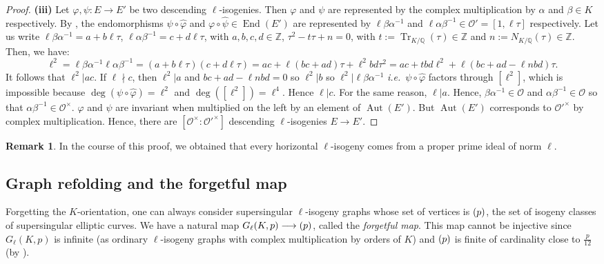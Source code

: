 \documentclass[a4paper,10pt]{report}
\theoremstyle{definition}
\theoremstyle{plain}
\theoremstyle{definition}
\newtheorem{Remark}[Definition]{Remark}
\newcommand{\ie}{\emph{i.e.}\ }
\newcommand{\Z}{\mathbb{Z}}
\newcommand{\Q}{\mathbb{Q}}
\newcommand{\mO}{\mathcal{O}}
\renewcommand{\(}{\left(}
\renewcommand{\)}{\right)}
\DeclareMathOperator{\End}{End}
\DeclareMathOperator{\Aut}{Aut}
\DeclareMathOperator{\Tr}{Tr}
\let\SS\relax
\DeclareMathOperator{\SS}{SS}
\begin{document}
\begin{proof}
\textbf{(iii)} Let $\varphi, \psi : E\longrightarrow E'$ be two descending $\ell$-isogenies. Then $\varphi$ and $\psi$ are represented by the complex multiplication by $\alpha$ and $\beta\in K$ respectively.  By \cite[exercise 6.10.(b)]{Silverman1},  the endomorphisms $\psi\circ\widehat{\varphi}$ and $\varphi\circ\widehat{\psi}\in\End(E')$ are represented by $\ell\beta\alpha^{-1}$ and $\ell\alpha\beta^{-1}\in\mO'=[1,\ell\tau]$ respectively.  Let us write $\ell\beta\alpha^{-1}=a+b\ell\tau$, $\ell\alpha\beta^{-1}=c+d\ell\tau$, with $a,b,c,d\in\Z$, $\tau^2-t\tau+n=0$, with $t:=\Tr_{K/\Q}(\tau)\in \Z$ and $n:=N_{K/\Q}(\tau)\in \Z$.  Then, we have:
\[\ell^2=\ell\beta\alpha^{-1}\ell\alpha\beta^{-1}=(a+b\ell\tau)(c+d\ell\tau)=ac+\ell(bc+ad)\tau+\ell^2bd\tau^2=ac+tbd\ell^2+\ell(bc+ad-\ell n bd)\tau.\]
It follows that $\ell^2|ac$.  If $\ell\nmid c$, then $\ell^2|a$ and $bc+ad-\ell n bd=0$ so $\ell^2|b$ so $\ell^2|\ell\beta\alpha^{-1}$ \ie  $\psi\circ\widehat{\varphi}$ factors through $[\ell^2]$, which is impossible because $\deg(\psi\circ\widehat{\varphi})=\ell^2$ and $\deg([\ell^2])=\ell^4$. Hence $\ell|c$. For the same reason, $\ell|a$. Hence, $\beta\alpha^{-1}\in\mO$ and $\alpha\beta^{-1}\in\mO$ so that $\alpha\beta^{-1}\in\mO^\times$.  $\varphi$ and $\psi$ are invariant when multiplied on the left by an element of $\Aut(E')$. But $\Aut(E')$ corresponds to $\mO'^\times$ by complex multiplication. Hence, there are $[\mO^\times:\mO'^\times]$ descending $\ell$-isogenies $E\longrightarrow E'$.
\end{proof}

\begin{Remark}\label{Remark 2}
In the course of this proof, we obtained that every horizontal $\ell$-isogeny comes from a proper prime ideal of norm $\ell$.
\end{Remark}

\subsection{Graph refolding and the forgetful map}

Forgetting the $K$-orientation, one can always consider supersingular $\ell$-isogeny graphs whose set of vertices is $\SS(p)$, the set of isogeny classes of supersingular elliptic curves. We have a natural map $G_\ell(K,p)\longrightarrow\SS(p)$, called the \emph{forgetful map}. This map cannot be injective since $G_\ell(K,p)$ is infinite (as ordinary $\ell$-isogeny graphs with complex multiplication by orders of $K$) and $\SS(p)$ is finite of cardinality close to $\frac{p}{12}$ (by \cite[Theorem V.4.1.(c)]{Silverman1}).
\end{document}
